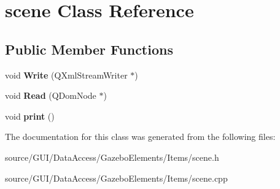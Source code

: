 \section{scene Class Reference}
\label{classscene}
\subsection*{Public Member Functions}
\begin{DoxyCompactItemize}
\item 
void {\bfseries Write} (Q\+Xml\+Stream\+Writer $\ast$)\label{classscene_a35afe246d90aa4341e0f5622028a1db0}

\item 
void {\bfseries Read} (Q\+Dom\+Node $\ast$)\label{classscene_a276d7c7dc14f11de39b7bfa34c09e04e}

\item 
void {\bfseries print} ()\label{classscene_a36eb4231c41f128ffac71c94ce602f56}

\end{DoxyCompactItemize}


The documentation for this class was generated from the following files\+:\begin{DoxyCompactItemize}
\item 
source/\+G\+U\+I/\+Data\+Access/\+Gazebo\+Elements/\+Items/scene.\+h\item 
source/\+G\+U\+I/\+Data\+Access/\+Gazebo\+Elements/\+Items/scene.\+cpp\end{DoxyCompactItemize}

